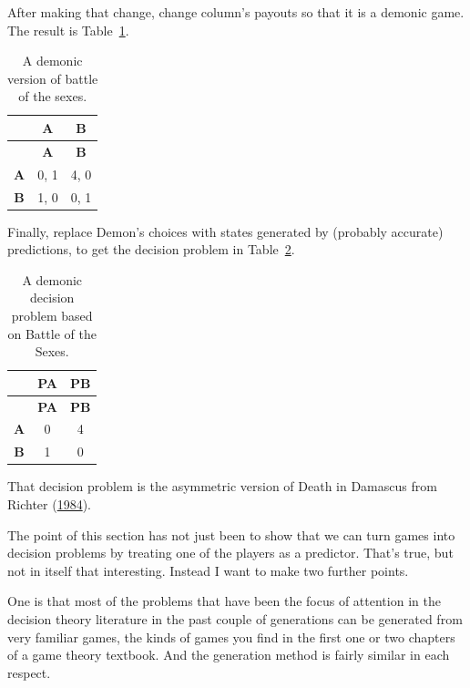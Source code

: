 \documentclass[
  12pt,
  letterpaper,
  DIV=11,
  numbers=noendperiod]{scrreprt}
\begin{document}
After making that change, change column's payouts so that it is a
demonic game. The result is Table~\ref{tbl-bach-demon}.

\hypertarget{tbl-bach-demon}{}
\begin{longtable}[]{@{}ccc@{}}
\caption{\label{tbl-bach-demon}A demonic version of battle of the
sexes.}\tabularnewline
\toprule\noalign{}
& \textbf{A} & \textbf{B} \\
\midrule\noalign{}
\endfirsthead
\toprule\noalign{}
& \textbf{A} & \textbf{B} \\
\midrule\noalign{}
\endhead
\bottomrule\noalign{}
\endlastfoot
\textbf{A} & 0, 1 & 4, 0 \\
\textbf{B} & 1, 0 & 0, 1 \\
\end{longtable}

Finally, replace Demon's choices with states generated by (probably
accurate) predictions, to get the decision problem in
Table~\ref{tbl-asymm-death-damascus}.

\hypertarget{tbl-asymm-death-damascus}{}
\begin{longtable}[]{@{}ccc@{}}
\caption{\label{tbl-asymm-death-damascus}A demonic decision problem
based on Battle of the Sexes.}\tabularnewline
\toprule\noalign{}
& \textbf{PA} & \textbf{PB} \\
\midrule\noalign{}
\endfirsthead
\toprule\noalign{}
& \textbf{PA} & \textbf{PB} \\
\midrule\noalign{}
\endhead
\bottomrule\noalign{}
\endlastfoot
\textbf{A} & 0 & 4 \\
\textbf{B} & 1 & 0 \\
\end{longtable}

That decision problem is the asymmetric version of Death in Damascus
from Richter (\protect\hyperlink{ref-Richter1984}{1984}).

The point of this section has not just been to show that we can turn
games into decision problems by treating one of the players as a
predictor. That's true, but not in itself that interesting. Instead I
want to make two further points.

One is that most of the problems that have been the focus of attention
in the decision theory literature in the past couple of generations can
be generated from very familiar games, the kinds of games you find in
the first one or two chapters of a game theory textbook. And the
generation method is fairly similar in each respect.
\end{document}
